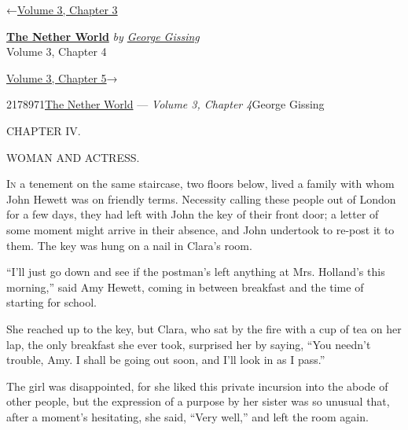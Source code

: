 \hypertarget{headerContainer}{}
\hypertarget{navigationHeader}{}
\protect\hypertarget{headerprevious}{}{←\href{/wiki/The_Nether_World/Volume_3/Chapter_3}{Volume
3, Chapter 3}}

\textbf{\protect\hypertarget{header_title_text}{}{\href{/wiki/The_Nether_World}{The
Nether World}}} \emph{by
\href{/wiki/Author:George_Gissing}{\protect\hypertarget{header_author_text}{}{{George
Gissing}}}}\\
\protect\hypertarget{header_section_text}{}{Volume 3, Chapter 4}

\protect\hypertarget{headernext}{}{\href{/wiki/The_Nether_World/Volume_3/Chapter_5}{Volume
3, Chapter 5}→}

\hypertarget{navigationNotes}{}

\hypertarget{ws-data}{}
\protect\hypertarget{ws-article-id}{}{2178971}\protect\hypertarget{ws-title}{}{\href{/wiki/The_Nether_World}{The
Nether World} --- \emph{Volume 3, Chapter
4}}\protect\hypertarget{ws-author}{}{George Gissing}

{\protect\hypertarget{70}{}{}}

{CHAPTER IV.}

WOMAN AND ACTRESS.

\textsc{In} a tenement on the same staircase, two floors below, lived a
family with whom John Hewett was on friendly terms. Necessity calling
these people out of London for a few days, they had left with John the
key of their front door; a letter of some moment might arrive in their
absence, and John undertook to re-post it to them. The key was hung on a
nail in Clara's room.

``I'll just go down and see if the postman's left anything at Mrs.
Holland's this morning,'' said Amy Hewett, coming in between breakfast
and the time of starting for school.

She reached up to the key, but Clara, who sat by the fire with a cup of
tea on her lap, the only breakfast she ever took, surprised her by
saying, ``You needn't trouble, Amy. I shall be going out soon, and I'll
look in as I pass.''

{\protect\hypertarget{71}{}{}}The girl was disappointed, for she liked
this private incursion into the abode of other people, but the
expression of a purpose by her sister was so unusual that, after a
moment's hesitating, she said, ``Very well,'' and left the room again.

